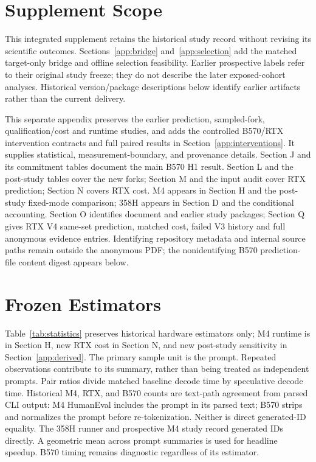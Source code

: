 \documentclass{article}
\begin{document}
\printAffiliationsAndNotice{}
\appendix
\renewcommand{\thetable}{A\arabic{table}}
\section{Supplement Scope}
This integrated supplement retains the historical study record without revising its scientific outcomes. Sections~\ref{app:bridge} and~\ref{app:selection} add the matched target-only bridge and offline selection feasibility. Earlier prospective labels refer to their original study freeze; they do not describe the later exposed-cohort analyses. Historical version/package descriptions below identify earlier artifacts rather than the current delivery.

This separate appendix preserves the earlier prediction, sampled-fork, qualification/cost and runtime studies, and adds the controlled B570/RTX intervention contracts and full paired results in Section~\ref{app:interventions}. It supplies statistical, measurement-boundary, and provenance details. Section J and its commitment tables document the main B570 H1 result. Section L and the post-study tables cover the new forks; Section M and the input audit cover RTX prediction; Section N covers RTX cost. M4 appears in Section H and the post-study fixed-mode comparison; 358H appears in Section D and the conditional accounting. Section O identifies document and earlier study packages; Section Q gives RTX V4 same-set prediction, matched cost, failed V3 history and full anonymous evidence entries. Identifying repository metadata and internal source paths remain outside the anonymous PDF; the nonidentifying B570 prediction-file content digest appears below.

\section{Frozen Estimators}
Table~\ref{tab:statistics} preserves historical hardware estimators only; M4 runtime is in Section H, new RTX cost in Section N, and new post-study sensitivity in Section~\ref{app:derived}. The primary sample unit is the prompt. Repeated observations contribute to its summary, rather than being treated as independent prompts. Pair ratios divide matched baseline decode time by speculative decode time. Historical M4, RTX, and B570 counts are text-path agreement from parsed CLI output: M4 HumanEval includes the prompt in its parsed text; B570 strips and normalizes the prompt before re-tokenization. Neither is direct generated-ID equality. The 358H runner and prospective M4 study record generated IDs directly. A geometric mean across prompt summaries is used for headline speedup. B570 timing remains diagnostic regardless of its estimator.
\end{document}
